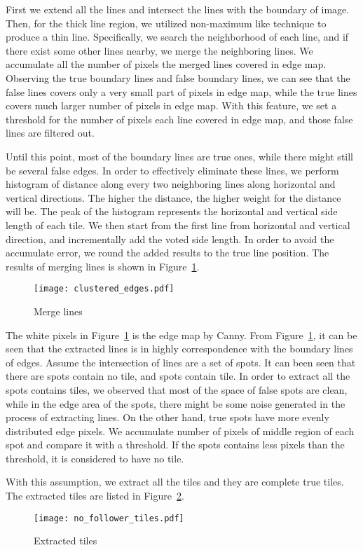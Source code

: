 \begin{enumerate}
			First we extend all the lines and intersect the lines with the boundary of image. Then, for 
			the thick line region, we utilized non-maximum like technique to produce a thin line. Specifically, 
			we search the neighborhood of each line, and if there exist some other lines nearby, we merge the 
			neighboring lines. We accumulate all the number of pixels the merged lines covered in edge map. 
			Observing the true boundary lines and false boundary lines, we can see that the false lines covers 
			only a very small part of pixels in edge map, while the true lines covers much larger number of pixels 
			in edge map. With this feature, we set a threshold for the number of pixels each line covered in edge 
			map, and those false lines are filtered out. 
			
			Until this point, most of the boundary lines are true ones, while there might still be several false 
			edges. In order to effectively eliminate these lines, we perform histogram of distance along every two 
			neighboring lines along horizontal and vertical directions. The higher the distance, the higher weight 
			for the distance will be. The peak of the histogram represents the horizontal and vertical side length 
			of each tile. We then start from the first line from horizontal and vertical direction, and 
			incrementally add the voted side length. In order to avoid the accumulate error, we round the added 
			results to the true line position. The results of merging lines is shown in Figure~\ref{Merge_line}. 
			
			\begin{figure}[htbp]
				  \centering
				  \texttt{[image: clustered\_edges.pdf]}
				  \caption{Merge lines}
				  \label{Merge_line}
			\end{figure}
\end{enumerate}
	The white pixels in Figure~\ref{Merge_line} is the edge map by Canny. From Figure~\ref{Merge_line}, it can be 
	seen that the extracted lines is in highly correspondence with the boundary 
	lines of edges. Assume the intersection of lines are a set of spots. It can been seen that there are spots contain
	no tile, and spots contain tile. In order to extract all the spots contains tiles, we observed that most of the 
	space of false spots are clean, while in the edge area of the spots, there might be some noise generated in the 
	process of extracting lines. On the other hand, true spots have more evenly distributed edge pixels. We accumulate 
	number of pixels of middle region of each spot and compare it with a threshold. If the spots contains less pixels 
	than the threshold, it is considered to have no tile.
	
	With this assumption, we extract all the tiles and they are complete true tiles. The extracted tiles are listed in 
	Figure~\ref{ex_tiles}.
	
	\begin{figure}[htbp]
		  \centering
		  \texttt{[image: no\_follower\_tiles.pdf]}
		  \caption{Extracted tiles}
		  \label{ex_tiles}
	\end{figure}